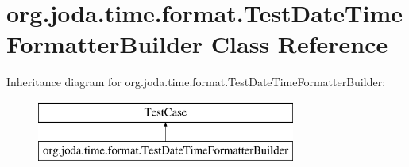 \hypertarget{classorg_1_1joda_1_1time_1_1format_1_1_test_date_time_formatter_builder}{\section{org.\-joda.\-time.\-format.\-Test\-Date\-Time\-Formatter\-Builder Class Reference}
\label{classorg_1_1joda_1_1time_1_1format_1_1_test_date_time_formatter_builder}
}
Inheritance diagram for org.\-joda.\-time.\-format.\-Test\-Date\-Time\-Formatter\-Builder\-:\begin{figure}[H]
\begin{center}
\leavevmode
\includegraphics[height=2.000000cm]{classorg_1_1joda_1_1time_1_1format_1_1_test_date_time_formatter_builder}
\end{center}
\end{figure}
